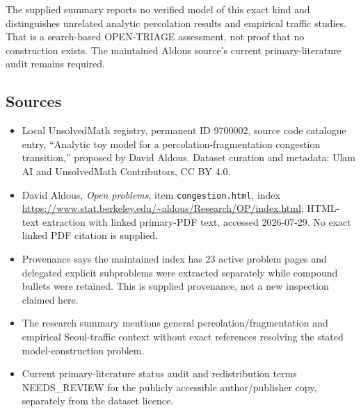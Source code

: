 \documentclass[11pt]{article}
\begin{document}
The supplied summary reports no verified model of this exact kind and distinguishes unrelated analytic percolation results and empirical traffic studies. That is a search-based OPEN-TRIAGE assessment, not proof that no construction exists. The maintained Aldous source's current primary-literature audit remains required.
\subsection{Sources}
\begin{itemize}
\item Local UnsolvedMath registry, permanent ID 9700002, source code catalogue entry, ``Analytic toy model for a percolation-fragmentation congestion transition,'' proposed by David Aldous. Dataset curation and metadata: Ulam AI and UnsolvedMath Contributors, CC BY 4.0.
\item David Aldous, \emph{Open problems}, item \texttt{congestion.html}, index \url{https://www.stat.berkeley.edu/~aldous/Research/OP/index.html}; HTML-text extraction with linked primary-PDF text, accessed 2026-07-29. No exact linked PDF citation is supplied.
\item Provenance says the maintained index has 23 active problem pages and delegated explicit subproblems were extracted separately while compound bullets were retained. This is supplied provenance, not a new inspection claimed here.
\item The research summary mentions general percolation/fragmentation and empirical Seoul-traffic context without exact references resolving the stated model-construction problem.
\item Current primary-literature status audit and redistribution terms NEEDS\_REVIEW for the publicly accessible author/publisher copy, separately from the dataset licence.
\end{itemize}
\end{document}
